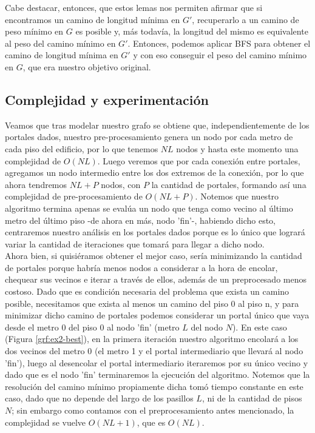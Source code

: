 \documentclass{article}
\theoremstyle{definition}
\theoremstyle{remark}
\begin{document}
Cabe destacar, entonces, que estos lemas nos permiten afirmar que si encontramos un camino de longitud mínima en $G'$, recuperarlo a un camino de peso mínimo en $G$ es posible y, más todavía, la longitud del mismo es equivalente al peso del camino mínimo en $G'$. Entonces, podemos aplicar BFS para obtener el camino de longitud mínima en $G'$ y con eso conseguir el peso del camino mínimo en $G$, que era nuestro objetivo original.

\subsection{Complejidad y experimentación}

Veamos que tras modelar nuestro grafo se obtiene que, independientemente de los portales dados, nuestro pre-procesamiento genera un nodo por cada metro de cada piso del edificio, por lo que tenemos $NL$ nodos y hasta este momento una complejidad de $O(NL)$. Luego veremos que por cada conexión entre portales, agregamos un nodo intermedio entre los dos extremos de la conexión, por lo que ahora tendremos $NL+P$ nodos, con $P$ la cantidad de portales, formando así una complejidad de pre-procesamiento de $O(NL+P)$. Notemos que nuestro algoritmo termina apenas se evalúa un nodo que tenga como vecino al último metro del último piso -de ahora en más, nodo 'fin'-, habiendo dicho esto, centraremos nuestro análisis en los portales dados porque es lo único que logrará variar la cantidad de iteraciones que tomará para llegar a dicho nodo. \\

Ahora bien, si quisiéramos obtener el mejor caso, sería minimizando la cantidad de portales porque habría menos nodos a considerar a la hora de encolar, chequear sus vecinos e iterar a través de ellos, además de un preprocesado menos costoso. Dado que es condición necesaria del problema que exista un camino posible, necesitamos que exista al menos un camino del piso 0 al piso n, y para minimizar dicho camino de portales podemos considerar un portal único que vaya desde el metro 0 del piso 0 al nodo 'fin' (metro $L$ del nodo $N$). En este caso (Figura \ref{grf:ex2-best}), en la primera iteración nuestro algoritmo encolará a los dos vecinos del metro 0 (el metro 1 y el portal intermediario que llevará al nodo 'fin'), luego al desencolar el portal intermediario iteraremos por su único vecino y dado que es el nodo 'fin' terminaremos la ejecución del algoritmo. Notemos que la resolución del camino mínimo propiamente dicha tomó tiempo constante en este caso, dado que no depende del largo de los pasillos $L$, ni de la cantidad de pisos $N$; sin embargo como contamos con el preprocesamiento antes mencionado, la complejidad se vuelve $O(NL+1)$, que es $O(NL)$.\\
\end{document}

